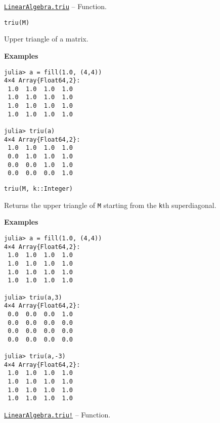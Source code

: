 \hypertarget{13861148483706203681}{} 
\hyperlink{13861148483706203681}{\texttt{LinearAlgebra.triu}}  -- {Function.}

\begin{adjustwidth}{2em}{0pt}


\begin{verbatim}
triu(M)
\end{verbatim}

Upper triangle of a matrix.

\textbf{Examples}


\begin{verbatim}
julia> a = fill(1.0, (4,4))
4×4 Array{Float64,2}:
 1.0  1.0  1.0  1.0
 1.0  1.0  1.0  1.0
 1.0  1.0  1.0  1.0
 1.0  1.0  1.0  1.0

julia> triu(a)
4×4 Array{Float64,2}:
 1.0  1.0  1.0  1.0
 0.0  1.0  1.0  1.0
 0.0  0.0  1.0  1.0
 0.0  0.0  0.0  1.0
\end{verbatim}




\begin{lstlisting}
triu(M, k::Integer)
\end{lstlisting}

Returns the upper triangle of \texttt{M} starting from the \texttt{k}th superdiagonal.

\textbf{Examples}


\begin{verbatim}
julia> a = fill(1.0, (4,4))
4×4 Array{Float64,2}:
 1.0  1.0  1.0  1.0
 1.0  1.0  1.0  1.0
 1.0  1.0  1.0  1.0
 1.0  1.0  1.0  1.0

julia> triu(a,3)
4×4 Array{Float64,2}:
 0.0  0.0  0.0  1.0
 0.0  0.0  0.0  0.0
 0.0  0.0  0.0  0.0
 0.0  0.0  0.0  0.0

julia> triu(a,-3)
4×4 Array{Float64,2}:
 1.0  1.0  1.0  1.0
 1.0  1.0  1.0  1.0
 1.0  1.0  1.0  1.0
 1.0  1.0  1.0  1.0
\end{verbatim}



\end{adjustwidth}
\hypertarget{17824694935904725032}{} 
\hyperlink{17824694935904725032}{\texttt{LinearAlgebra.triu!}}  -- {Function.}

